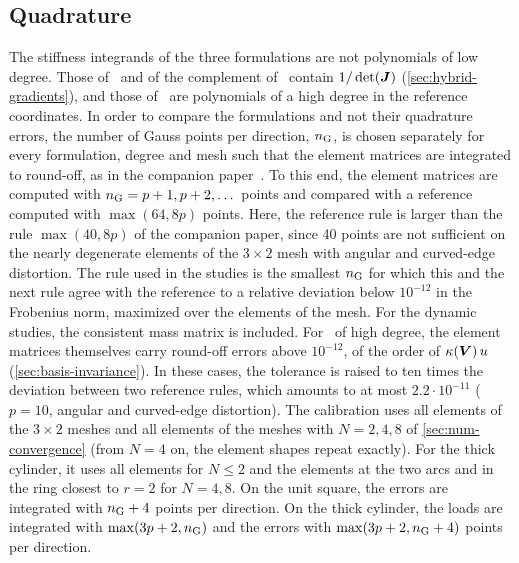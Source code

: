 \subsection{Quadrature}
\label{sec:num-quadrature}
%
The stiffness integrands of the three formulations are not polynomials of low degree. Those of \PP\ and of the complement of \PH\ contain $1/\det(\bm{J})$ (\cref{sec:hybrid-gradients}), and those of \PM\ are polynomials of a high degree in the reference coordinates. In order to compare the formulations and not their quadrature errors, the number of Gauss points per direction, $n_{\mathrm{G}}$, is chosen separately for every formulation, degree and mesh such that the element matrices are integrated to round-off, as in the companion paper~\cite{Eisentraeger2026axisymmetric}. To this end, the element matrices are computed with $n_{\mathrm{G}}=p+1,p+2,\dots$ points and compared with a reference computed with $\max(64,8p)$ points. Here, the reference rule is larger than the rule $\max(40,8p)$ of the companion paper, since 40 points are not sufficient on the nearly degenerate elements of the $3\times2$ mesh with angular and curved-edge distortion. The rule used in the studies is the smallest $n_{\mathrm{G}}$ for which this and the next rule agree with the reference to a relative deviation below $10^{-12}$ in the Frobenius norm, maximized over the elements of the mesh. For the dynamic studies, the consistent mass matrix is included. For \PM\ of high degree, the element matrices themselves carry round-off errors above $10^{-12}$, of the order of $\kappa(\bm{V})\,u$ (\cref{sec:basis-invariance}). In these cases, the tolerance is raised to ten times the deviation between two reference rules, which amounts to at most $2.2\cdot10^{-11}$ ($p=10$, angular and curved-edge distortion). The calibration uses all elements of the $3\times2$ meshes and all elements of the meshes with $N=2,4,8$ of \cref{sec:num-convergence} (from $N=4$ on, the element shapes repeat exactly). For the thick cylinder, it uses all elements for $N\le2$ and the elements at the two arcs and in the ring closest to $r=2$ for $N=4,8$. On the unit square, the errors are integrated with $n_{\mathrm{G}}+4$ points per direction. On the thick cylinder, the loads are integrated with $\max(3p+2,n_{\mathrm{G}})$ and the errors with $\max(3p+2,n_{\mathrm{G}}+4)$ points per direction.

